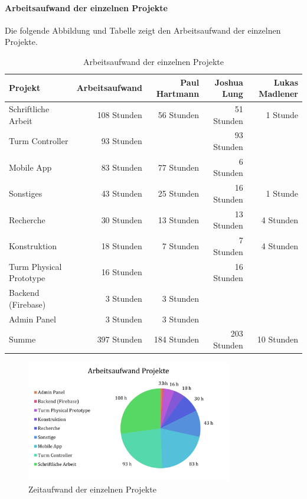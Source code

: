 \paragraph{Arbeitsaufwand der einzelnen Projekte}
Die folgende Abbildung und Tabelle zeigt den Arbeitsaufwand der einzelnen Projekte.

\begin{table}[!h]
  \centering
  \begin{tabular}{lrrrr}
    \toprule
    \textbf{Projekt}        & \textbf{Arbeitsaufwand} & \textbf{Paul Hartmann} & \textbf{Joshua Lung} & \textbf{Lukas Madlener} \\
    \midrule
    Schriftliche Arbeit     & 108 Stunden             & 56 Stunden             & 51 Stunden           & 1 Stunde                \\
    Turm Controller         & 93 Stunden              &                        & 93 Stunden           &                         \\
    Mobile App              & 83 Stunden              & 77 Stunden             & 6 Stunden            &                         \\
    Sonstiges               & 43 Stunden              & 25 Stunden             & 16 Stunden           & 1 Stunde                \\
    Recherche               & 30 Stunden              & 13 Stunden             & 13 Stunden           & 4 Stunden               \\
    Konstruktion            & 18 Stunden              & 7 Stunden              & 7 Stunden            & 4 Stunden               \\
    Turm Physical Prototype & 16 Stunden              &                        & 16 Stunden           &                         \\
    Backend (Firebase)      & 3 Stunden               & 3 Stunden              &                      &                         \\
    Admin Panel             & 3 Stunden               & 3 Stunden              &                      &                         \\
    \midrule
    Summe                   & 397 Stunden             & 184 Stunden            & 203 Stunden          & 10 Stunden              \\
    \bottomrule
  \end{tabular}
  \caption{Arbeitsaufwand der einzelnen Projekte}
  \label{tab:zeiterfassung_projekte}
\end{table}

\begin{figure}[!ht]
  \centering
  \includegraphics[width=0.8\textwidth]{images/zeiterfassung_projekte.png}
  \caption{Zeitaufwand der einzelnen Projekte}
  \label{fig:zeiterfassung_projekte}
\end{figure}